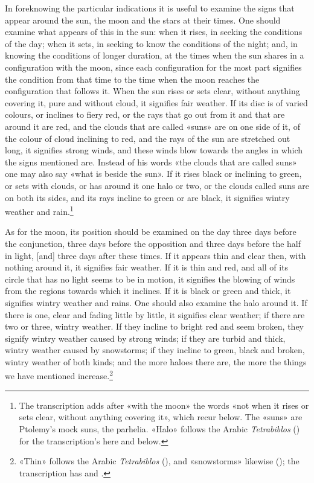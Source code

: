 \documentclass[11pt]{article}
\newcommand{\Fol}[1]{\marginpar{\footnotesize\color{gray}f.\,#1}}
\begin{document}
\par \Fol{34r}In foreknowing the particular indications it is useful to examine the signs that appear around the sun, the moon and the stars at their times. One should examine what appears of this in the sun: when it rises, in seeking the conditions of the day; when it sets, in seeking to know the conditions of the night; and, in knowing the conditions of longer duration, at the times when the sun shares in a configuration with the moon, since each configuration for the most part signifies the condition from that time to the time when the moon reaches the configuration that follows it. When the sun rises or sets clear, without anything covering it, pure and without cloud, it signifies fair weather. If its disc is of varied colours, or inclines to fiery red, or the rays that go out from it and that are around it are red, and the clouds that are called «suns» are on one side of it, of the colour of cloud inclining to red, and the rays of the sun are stretched out long, it signifies strong winds, and these winds blow towards the angles in which the signs mentioned are. Instead of his words «the clouds that are called suns» one may also say «what is beside the sun». If it rises black or inclining to green, or sets with clouds, or has around it one halo or two, or the clouds called suns are on both its sides, and its rays incline to green or are black, it signifies wintry weather and rain.\footnote{The transcription adds after «with the moon» the words «not when it rises or sets clear, without anything covering it», which recur below. The «suns» are Ptolemy's mock suns, the parhelia. «Halo» follows the Arabic \emph{Tetrabiblos} () for the transcription's  here and below.}\par
\par As for the moon, its position should be examined on the day three days before the conjunction, three days before the opposition and three days before the half in light, [and] three days after these times. If it appears thin and clear then, with nothing around it, it signifies fair weather. If it is thin and red, and all of its circle that has no light seems to be in motion, it signifies the blowing of winds from the regions towards which it inclines. If it is black or green and thick, it signifies wintry weather and rains. One should also examine the halo around it. If there is one, clear and fading little by little, it signifies clear weather; if there are two or three, wintry weather. If they incline to bright red and seem broken, they signify wintry weather caused by strong winds; if they are turbid and thick, wintry weather caused by snowstorms; if they incline to green, black and broken, wintry weather of both kinds; and the more haloes there are, the more the things we have mentioned increase.\footnote{«Thin» follows the Arabic \emph{Tetrabiblos} (), and «snowstorms» likewise (); the transcription has  and .}\par
\end{document}
